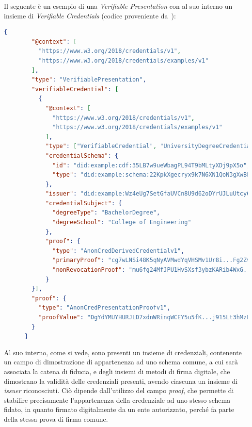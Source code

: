 Il seguente è un esempio di una \textit{Verifiable Presentation} con al suo interno un insieme di \textit{Verifiable Credentials} (codice proveniente da~\cite{site:vpw3c}):
\begin{lstlisting}[language=json]
    {
        "@context": [
          "https://www.w3.org/2018/credentials/v1",
          "https://www.w3.org/2018/credentials/examples/v1"
        ],
        "type": "VerifiablePresentation",
        "verifiableCredential": [
          {
            "@context": [
              "https://www.w3.org/2018/credentials/v1",
              "https://www.w3.org/2018/credentials/examples/v1"
            ],
            "type": ["VerifiableCredential", "UniversityDegreeCredential"],
            "credentialSchema": {
              "id": "did:example:cdf:35LB7w9ueWbagPL94T9bMLtyXDj9pX5o",
              "type": "did:example:schema:22KpkXgecryx9k7N6XN1QoN3gXwBkSU8SfyyYQG"
            },
            "issuer": "did:example:Wz4eUg7SetGfaUVCn8U9d62oDYrUJLuUtcy619",
            "credentialSubject": {
              "degreeType": "BachelorDegree",
              "degreeSchool": "College of Engineering"
            },
            "proof": {
              "type": "AnonCredDerivedCredentialv1",
              "primaryProof": "cg7wLNSi48K5qNyAVMwdYqVHSMv1Ur8i...Fg2ZvWF6zGvcSAsym2sgSk737",
              "nonRevocationProof": "mu6fg24MfJPU1HvSXsf3ybzKARib4WxG...RSce53M6UwQCxYshCuS3d2h"
            }
        }],
        "proof": {
          "type": "AnonCredPresentationProofv1",
          "proofValue": "DgYdYMUYHURJLD7xdnWRinqWCEY5u5fK...j915Lt3hMzLHoPiPQ9sSVfRrs1D"
        }
      }
\end{lstlisting}

Al suo interno, come si vede, sono presenti un insieme di credenziali, contenente un campo di dimostrazione di appartenenza ad uno schema comune,
a cui sarà associata la catena di fiducia, e degli insiemi di metodi di firma digitale, che dimostrano la validità delle credenziali presenti,
avendo ciascuna un insieme di \textit{issuer} riconosciuti. Ciò dipende dall'utilizzo del campo \textit{proof}, che permette di stabilire precisamente
l'appartenenza della credenziale ad uno stesso schema fidato, in quanto firmato digitalmente da un ente autorizzato, perché fa parte della stessa prova di firma 
comune. \\

